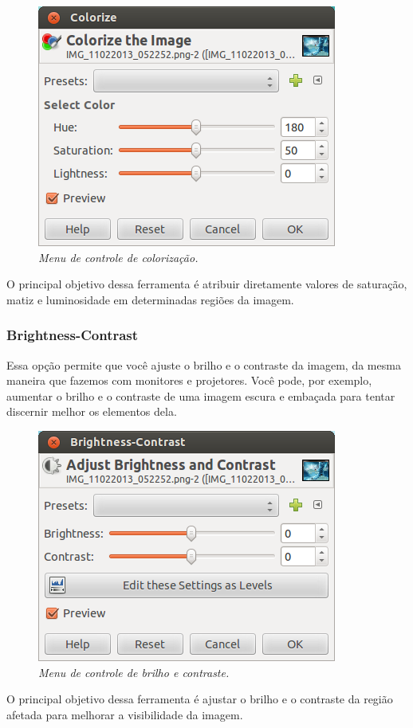 \documentclass[12pt,onecolumn]{article}
\begin{document}
        \begin{figure}[H]
          \centering
          \includegraphics[width=.6\linewidth]{screenshots/10-colorize.png}
          \caption{
            \footnotesize
            \it
            Menu de controle de colorização.
          }
          \label{fig:colorize}
        \end{figure}
        
        O principal objetivo dessa ferramenta é atribuir diretamente valores de
        saturação, matiz e luminosidade em determinadas regiões da imagem.
      
      \subsubsection{Brightness-Contrast}
        Essa opção permite que você ajuste o brilho e o contraste da imagem, da
        mesma maneira que fazemos com monitores e projetores. Você pode, por
        exemplo, aumentar o brilho e o contraste de uma imagem escura e embaçada
        para tentar discernir melhor os elementos dela.
        
        \begin{figure}[H]
          \centering
          \includegraphics[width=.6\linewidth]{screenshots/11-brightness_contrast.png}
          \caption{
            \footnotesize
            \it
            Menu de controle de brilho e contraste.
          }
          \label{fig:brightness_contrast}
        \end{figure}
        
        O principal objetivo dessa ferramenta é ajustar o brilho e o contraste
        da região afetada para melhorar a visibilidade da imagem.
\end{document}
